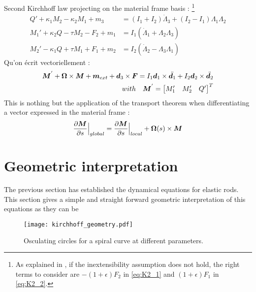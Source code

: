 Second Kirchhoff law projecting on the material frame basis : \footnote{As explained in \cite[p. 18]{Dill1992}, if the inextensibility assumption does not hold, the right terms to consider are $-(1+\epsilon)F_2$ in \cref{eq:K2_1} and $(1+\epsilon)F_1$ in \cref{eq:K2_2}.}
\begin{subequations}
	\begin{align}
		Q' + \kappa_1 M_2 - \kappa_2 M_1 + m_3 &= (I_1 + I_2)\dot{\Lambda}_3 + (I_2 - I_1)\Lambda_1\Lambda_2
		\label{eq:K2_2}\\
		M_1' + \kappa_2 Q - \tau M_2 - F_2 + m_1 &= I_1 (\dot{\Lambda}_1 + \Lambda_2 \Lambda_3)
		\label{eq:K2_1}\\
		M_2' - \kappa_1 Q + \tau M_1 + F_1 + m_2 &= I_2 (\dot{\Lambda}_2 - \Lambda_3 \Lambda_1)
		\label{eq:K2_2}
	\end{align}
\end{subequations}
Qu'on écrit vectoriellement : 
\begin{align}
	\boldsymbol{M}^{'} + \boldsymbol{\Omega} \times \boldsymbol{M} + \boldsymbol{m}_{ext} + \boldsymbol{d}_3 \times \boldsymbol{F} = I_1 \boldsymbol{d}_1 \times \ddot{\boldsymbol{d}_1} + I_2 \boldsymbol{d}_2 \times \ddot{\boldsymbol{d}_2} \\
	\quad with \quad
	\boldsymbol{M}^{'} = 
	\begin{bmatrix}M'_1 & M'_2 & Q'\end{bmatrix}^T
\end{align}
This is nothing but the application of the transport theorem when differentiating a vector expressed in the material frame : 
\begin{equation}
	\frac{\partial \boldsymbol{M}}{\partial s}\Bigr|_{global} = \frac{\partial \boldsymbol{M}}{\partial s}\Bigr|_{local} + \boldsymbol{\Omega}(s) \times \boldsymbol{M}
\end{equation}


\clearpage
\makebox[\textwidth]{} %
\section{Geometric interpretation}

The previous section has established the dynamical equations for elastic rods. This section gives a simple and straight forward geometric interpretation of this equations as they can be 
 
\begin{figure}[h]
	\centering
	\texttt{[image: kirchhoff\_geometry.pdf]}
	\caption{Osculating circles for a spiral curve at different parameters.}
	\label{fig:5}
\end{figure} 


